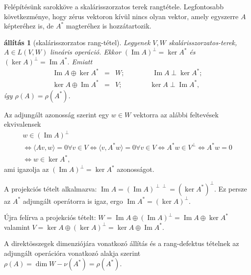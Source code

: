 \documentclass[9pt, a4paper, showtrims]{memoir}
\makeatletter
\renewenvironment{proof}[1][\proofname]
    {\par\pushQED{\qed}%
    \normalfont \topsep6\p@\@plus6\p@\relax
    \trivlist
    \item[\hskip\labelsep
        \itshape
    #1\@addpunct{:}]\ignorespaces}
    {\popQED\endtrivlist\@endpefalse}
\theoremstyle{plain}
\newtheorem{proposition}{állítás}[chapter]
\theoremstyle{remark}
\theoremstyle{definition}
\DeclareMathOperator{\im}{Im}
\newcommand{\ip}[2]{\langle#1,#2\rangle}
\makeatother
\begin{document}
Felépítésünk sarokköve a skalárisszorzatos terek rangtétele. 
Legfontosabb következménye, hogy zérus vektoron kívül nincs olyan vektor,
amely egyszerre $A$ képteréhez is, de $A^\ast$ magteréhez is hozzátartozik.
\begin{proposition}[skalárisszorzatos rang-tétel]\label{pr:skrang}
    Legyenek $V,W$ skalárisszorzatos-terek, $A\in L\left( V,W \right)$ lineáris operáció.
    Ekkor 
         $(\im A)^\perp=\ker A^\ast$ és
         $(\ker A)^\perp=\im A^\ast.$
    Emiatt 
    \begin{eqnarray*}
        \im A\oplus\ker A^\ast&=& W;\qquad\qquad\im A\perp\ker A^\ast;\\
        \ker A\oplus\im A^\ast&=& V;\qquad\qquad\ker A\perp\im A^\ast,
    \end{eqnarray*}
    így $\rho\left( A \right)=\rho\left( A^\ast \right)$.
\end{proposition}
\begin{proof}
    Az adjungált azonosság szerint egy $w\in W$ vektorra az alábbi feltevések ekvivalensek
    \begin{multline*}
        w\in\left( \im A \right)^\perp
        \\
        \iff
        \ip{Av}{w}=0 \forall v\in V
        \iff
        \ip{v}{A^\ast w}=0 \forall v\in V
        \iff
        A^\ast w\in V^\perp
        \iff
        A^\ast w=0
        \\
        \iff
        w\in\ker A^\ast,
    \end{multline*}
    ami igazolja az $\left( \im A \right)^\perp=\ker A^\ast$ azonosságot.
    
    A projekciós tételt alkalmazva: 
    \begin{math}
        \im A=(\im A)^{\perp\perp}=(\ker A^\ast)^\perp
    \end{math}.
    Ez persze az $A^\ast$ adjungált operátorra is igaz, 
    ergo
    \begin{math}
        \im A^\ast = \left( \ker A \right)^\perp.
    \end{math}

    Újra felírva a projekciós tételt: 
    \begin{math}
        W=\im A\oplus\left( \im A \right)^\perp
        =\im A\oplus\ker A^\ast
    \end{math}
    valamint 
    \begin{math}
        V=\ker A\oplus\left( \ker A \right)^\perp
        =
        \ker A\oplus\im A^\ast.
    \end{math}

    A direktösszegek dimenziójára vonatkozó állítás és a rang-defektus tételnek az adjungált operációra vonatkozó alakja szerint
    \begin{math}
        \rho\left( A \right)=\dim W-\nu\left( A^\ast \right)=\rho\left( A^\ast \right).
    \end{math}
\end{proof}
\end{document}
